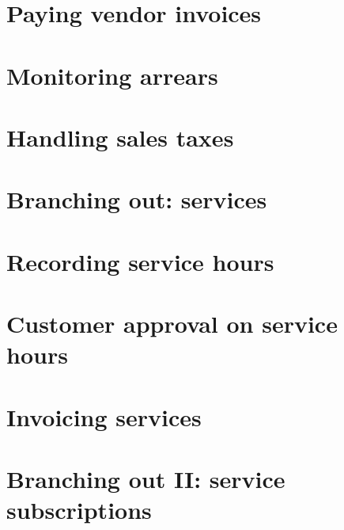 

\chapter{Paying vendor invoices}




\chapter{Monitoring arrears}


\chapter{Handling sales taxes}



% 

\chapter{Branching out: services}



\chapter{Recording service hours}

\chapter{Customer approval on service hours}

\chapter{Invoicing services}

\chapter{Branching out II: service subscriptions}


